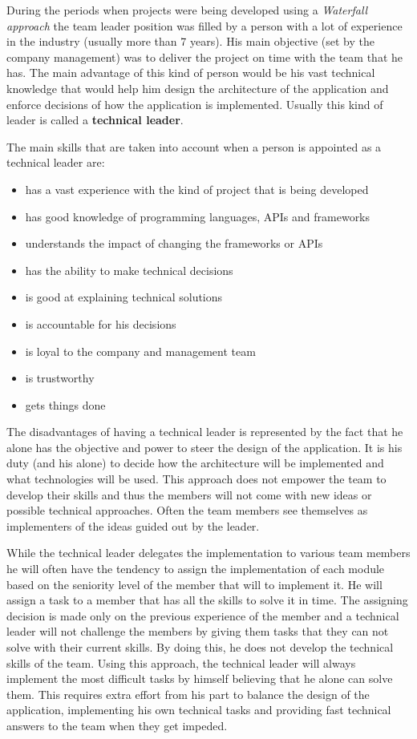 During the periods when projects were being developed using a \textit{Waterfall approach} the team leader position was filled by a person with a lot of experience in the industry (usually more than 7 years). His main objective (set by the company management) was to deliver the project on time with the team that he has. The main advantage of this kind of person would be his vast technical knowledge that would help him design the architecture of the application and enforce decisions of how the application is implemented. Usually this kind of leader is called a \textbf{technical leader}.

The main skills that are taken into account when a person is appointed as a technical leader are:

\begin{itemize}
\item has a vast experience with the kind of project that is being developed
\item has good knowledge of programming languages, APIs and frameworks
\item understands the impact of changing the frameworks or APIs
\item has the ability to make technical decisions
\item is good at explaining technical solutions
\item is accountable for his decisions
\item is loyal to the company and management team
\item is trustworthy
\item gets things done
\end{itemize}

The disadvantages of having a technical leader is represented by the fact that he alone has the objective and power to steer the design of the application. It is his duty (and his alone) to decide how the architecture will be implemented and what technologies will be used. This approach does not empower the team to develop their skills and thus the members will not come with new ideas or possible technical approaches. Often the team members see themselves as implementers of the ideas guided out by the leader. 

While the technical leader delegates the implementation to various team members he will often have the tendency to assign the implementation of each module based on the seniority level of the member that will to implement it. He will assign a task to a member that has all the skills to solve it in time. The assigning decision is made only on the previous experience of the member and a technical leader will not challenge the members by giving them tasks that they can not solve with their current skills. By doing this, he does not develop the technical skills of the team. Using this approach, the technical leader will always implement the most difficult tasks by himself believing that he alone can solve them. This requires extra effort from his part to balance the design of the application, implementing his own technical tasks and providing fast technical answers to the team when they get impeded.

